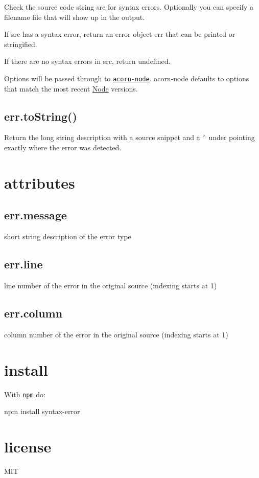Check the source code string {\ttfamily src} for syntax errors. Optionally you can specify a filename {\ttfamily file} that will show up in the output.

If {\ttfamily src} has a syntax error, return an error object {\ttfamily err} that can be printed or stringified.

If there are no syntax errors in {\ttfamily src}, return {\ttfamily undefined}.

Options will be passed through to \href{https://github.com/browserify/acorn-node}{\tt acorn-\/node}. acorn-\/node defaults to options that match the most recent \mbox{\hyperlink{classNode}{Node}} versions.

\subsection*{err.\+to\+String()}

Return the long string description with a source snippet and a {\ttfamily $^\wedge$} under pointing exactly where the error was detected.

\section*{attributes}

\subsection*{err.\+message}

short string description of the error type

\subsection*{err.\+line}

line number of the error in the original source (indexing starts at 1)

\subsection*{err.\+column}

column number of the error in the original source (indexing starts at 1)

\section*{install}

With \href{http://npmjs.org}{\tt npm} do\+:


\begin{DoxyCode}
npm install syntax-error
\end{DoxyCode}


\section*{license}

M\+IT 